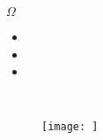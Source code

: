 \documentclass[10pt]{beamer}
\begin{document}
\begin{frame}{$\Omega$}
    \begin{itemize}
        \item 
        \item 
        \item 
    \end{itemize}
\end{frame}


\begin{frame}[fragile]{}
        
    \begin{lstlisting}[style = CppStyle]
    
    \end{lstlisting}

\end{frame}    


\begin{frame}{}
    \begin{figure}[h!]
        \texttt{[image: ]}
        \caption{}
    \end{figure}
\end{frame}    
\end{document}
